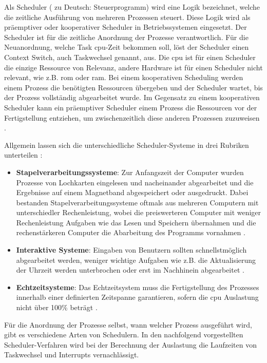 \documentclass[../EDF Master Thesis.tex]{subfiles}
\begin{document}
Als Scheduler ( zu Deutsch: Steuerprogramm) wird eine Logik bezeichnet, welche die zeitliche Ausführung von mehreren Prozessen steuert.
Diese Logik wird als präemptiver oder kooperativer Scheduler in Betriebssystemen eingesetzt.
Der Scheduler ist für die zeitliche Anordnung der Prozesse verantwortlich.
Für die Neuanordnung, welche Task \ac{cpu}-Zeit bekommen soll, löst der Scheduler einen Context Switch, auch Taskwechsel genannt, aus.
Die \ac{cpu} ist für einen Scheduler die einzige Ressource von Relevanz, andere Hardware ist für einen Scheduler nicht relevant, wie z.B. \ac{rom} oder \ac{ram}.
Bei einem kooperativen Scheduling werden einem Prozess die benötigten Ressourcen übergeben und der Scheduler wartet, bis der Prozess vollständig abgearbeitet wurde.
Im Gegensatz zu einem kooperativen Scheduler kann ein präemptiver Scheduler einem Prozess die Ressourcen vor der Fertigstellung entziehen, um zwischenzeitlich diese anderen Prozessen zuzuweisen \parencite{mikrocontroller:001}.

Allgemein lassen sich die unterschiedliche Scheduler-Systeme in drei Rubriken unterteilen \parencite{wiki:007}:
\begin{itemize}
    \item \textbf{Stapelverarbeitungssysteme}: Zur Anfangszeit der Computer wurden Prozesse von Lochkarten eingelesen und nacheinander abgearbeitet und die Ergebnisse auf einem Magnetband abgespeichert oder ausgedruckt.
                                               Dabei bestanden Stapelverarbeitungssysteme oftmals aus mehreren Computern mit unterschiedler Rechenleistung, wobei die preiswerteren Computer mit weniger Rechenleistung Aufgaben wie das Lesen und Speichern übernahmen und die rechenstärkeren Computer die Abarbeitung des Programms vornahmen \autocite{grundkurs_betriebssysteme}.
    \item \textbf{Interaktive Systeme}: Eingaben von Benutzern sollten schnellstmöglich abgearbeitet werden, weniger wichtige Aufgaben wie z.B. die Aktualisierung der Uhrzeit werden unterbrochen oder erst im Nachhinein abgearbeitet \autocite{mikrocontroller:002}.
    \item \textbf{Echtzeitsysteme}: Das Echtzeitsystem muss die Fertigstellung des Prozesses innerhalb einer definierten Zeitspanne garantieren, sofern die \ac{cpu} Auslastung nicht über 100\% beträgt \autocite{mikrocontroller:002}.
\end{itemize}

Für die Anordnung der Prozesse selbst, wann welcher Prozess ausgeführt wird, gibt es verschiedene Arten von Schedulern.
In den nachfolgend vorgestellten Scheduler-Verfahren wird bei der Berechnung der Auslastung die Laufzeiten von Taskwechsel und Interrupts vernachlässigt.
\end{document}
